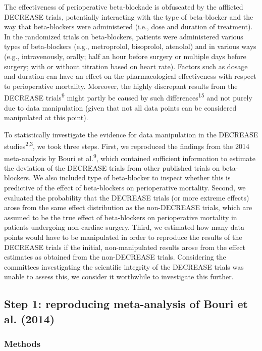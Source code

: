 \documentclass[]{article}
\begin{document}
The effectiveness of perioperative beta-blockade is obfuscated by the
afflicted DECREASE trials, potentially interacting with the type of
beta-blocker and the way that beta-blockers were administered (i.e.,
dose and duration of treatment). In the randomized trials on
beta-blockers, patients were administered various types of beta-blockers
(e.g., metroprolol, bisoprolol, atenolol) and in various ways (e.g.,
intravenously, orally; half an hour before surgery or multiple days
before surgery; with or without titration based on heart rate). Factors
such as dosage and duration can have an effect on the pharmacological
effectiveness with respect to perioperative mortality. Moreover, the
highly discrepant results from the DECREASE trials\textsuperscript{9}
might partly be caused by such differences\textsuperscript{15} and not
purely due to data manipulation (given that not all data points can be
considered manipulated at this point).

To statistically investigate the evidence for data manipulation in the
DECREASE studies\textsuperscript{2,3}, we took three steps. First, we
reproduced the findings from the 2014 meta-analysis by Bouri et
al.\textsuperscript{9}, which contained sufficient information to
estimate the deviation of the DECREASE trials from other published
trials on beta-blockers. We also included type of beta-blocker to
inspect whether this is predictive of the effect of beta-blockers on
perioperative mortality. Second, we evaluated the probability that the
DECREASE trials (or more extreme effects) arose from the same effect
distribution as the non-DECREASE trials, which are assumed to be the
true effect of beta-blockers on perioperative mortality in patients
undergoing non-cardiac surgery. Third, we estimated how many data points
would have to be manipulated in order to reproduce the results of the
DECREASE trials if the initial, non-manipulated results arose from the
effect estimates as obtained from the non-DECREASE trials. Considering
the committees investigating the scientific integrity of the DECREASE
trials was unable to assess this, we consider it worthwhile to
investigate this further.

\subsection{Step 1: reproducing meta-analysis of Bouri et al.
(2014)}\label{step-1-reproducing-meta-analysis-of-bouri-et-al.-2014}

\subsubsection{Methods}\label{methods}
\end{document}
